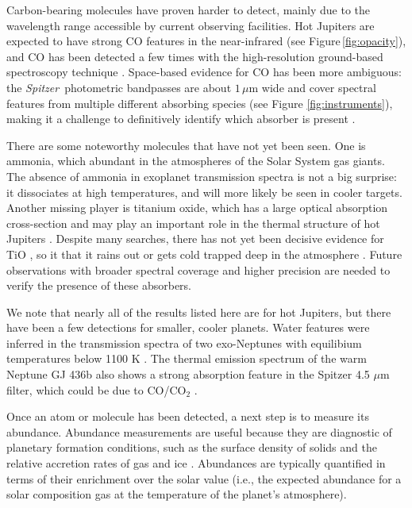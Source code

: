\documentclass[graybox,natbib,nosecnum]{svmult}
\newcommand{\project}[1]{\textsl{#1}}
\newcommand{\Spitzer}{\project{Spitzer}}
\begin{document}
Carbon-bearing molecules have proven harder to detect, mainly due to the wavelength range accessible by current observing facilities. Hot Jupiters are expected to have strong CO features in the near-infrared (see Figure\,\ref{fig:opacity}), and CO has been detected a few times with the high-resolution ground-based spectroscopy technique \citep{dekok13,brogi14}.  Space-based evidence for CO has been more ambiguous: the \Spitzer\ photometric bandpasses are about $1\,\mu$m wide and cover spectral features from multiple different absorbing species (see Figure \ref{fig:instruments}), making it a challenge to definitively identify which absorber is present \citep[e.g.][]{desert09, stevenson10, madhusudhan11, morley17}.  

There are some noteworthy molecules that have not yet been seen. One is ammonia, which abundant in the atmospheres of the Solar System gas giants. The absence of ammonia in exoplanet transmission spectra is not a big surprise: it dissociates at high temperatures, and will more likely be seen in cooler targets.  Another missing player is titanium oxide, which has a large optical absorption cross-section and may play an important role in the thermal structure of hot Jupiters \citep{fortney08}. Despite many searches, there has not yet been decisive evidence for TiO \citep[e.g.,]{sing13, evans16}, so it that it rains out or gets cold trapped deep in the atmosphere \citep{parmentier13}.
 Future observations with broader spectral coverage and higher precision are needed to verify the presence of these absorbers.

We note that nearly all of the results listed here are for hot Jupiters, but there have been a few detections for smaller, cooler planets. Water features were inferred in the transmission spectra of two exo-Neptunes with equilibium temperatures below 1100 K \citep{fraine14, wakeford17}. The thermal emission spectrum of the warm Neptune GJ 436b also shows a strong absorption feature in the Spitzer 4.5 $\mu$m filter, which could be due to CO/CO$_2$ \citep{morley17}. 

Once an atom or molecule has been detected, a next step is to measure its abundance. Abundance measurements are useful because they are diagnostic of planetary formation conditions, such as the surface density of solids and the relative accretion rates of gas and ice \citep[e.g.][]{fortney13, mordasini16}. Abundances are typically quantified in terms of their enrichment over the solar value (i.e., the expected abundance for a solar composition gas at the temperature of the planet's atmosphere).
\end{document}
